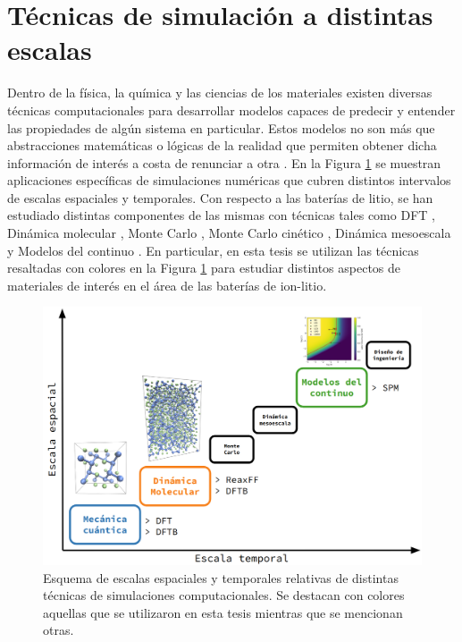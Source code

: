\section{Técnicas de simulación a distintas escalas}

Dentro de la física, la química y las ciencias de los materiales existen diversas
técnicas computacionales para desarrollar modelos capaces de predecir y entender 
las propiedades de algún sistema en particular. Estos modelos no son más que 
abstracciones matemáticas o lógicas de la realidad que permiten obtener dicha 
información de interés a costa de renunciar a otra \cite{franco2013}. 
En la Figura \ref{fig:escalas} se muestran aplicaciones específicas de 
simulaciones numéricas que cubren distintos intervalos de escalas espaciales y 
temporales. Con respecto a las baterías de litio, se han estudiado distintas
componentes de las mismas con técnicas tales como DFT \cite{he2019}, Dinámica 
molecular \cite{yao2022}, Monte Carlo \cite{mercer2017}, Monte Carlo cinético 
\cite{gavilan2021}, Dinámica mesoescala \cite{ryan2019} y Modelos del continuo
\cite{brosa2022}. En particular, en esta tesis se utilizan las técnicas 
resaltadas con colores en la Figura \ref{fig:escalas} para estudiar distintos 
aspectos de materiales de interés en el área de las baterías de ion-litio.

\begin{figure}[h!]
    \centering
    \includegraphics[width=.8\textwidth]{Metodos/tecnicas/escalas.png}
    \caption{Esquema de escalas espaciales y temporales relativas de distintas 
    técnicas de simulaciones computacionales. Se destacan con colores aquellas que 
    se utilizaron en esta tesis mientras que se mencionan otras.}
    \label{fig:escalas}
\end{figure}

